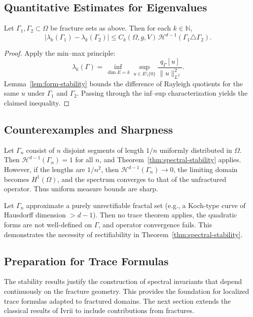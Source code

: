 \subsection{Quantitative Estimates for Eigenvalues}
\begin{theorem}
\label{thm:eigenvalue-continuity}
Let $\Gamma_1,\Gamma_2\subset\Omega$ be fracture sets as above. Then for each
$k\in\mathbb{N}$,
\[
|\lambda_k(\Gamma_1)-\lambda_k(\Gamma_2)|
  \leq C_k(\Omega,g,V)\,
     \mathcal{H}^{d-1}(\Gamma_1\triangle \Gamma_2).
\]
\end{theorem}

\begin{proof}
Apply the min–max principle:
\[
\lambda_k(\Gamma)
  = \inf_{\dim E=k}\sup_{u\in E\setminus\{0\}}
   \frac{q_\Gamma[u]}{\|u\|_{L^2}^2}.
\]
Lemma~\ref{lem:form-stability} bounds the difference of Rayleigh quotients
for the same $u$ under $\Gamma_1$ and $\Gamma_2$. Passing through the
inf–sup characterization yields the claimed inequality.
\end{proof}

\subsection{Counterexamples and Sharpness}
\begin{example}
Let $\Gamma_n$ consist of $n$ disjoint segments of length $1/n$ uniformly
distributed in $\Omega$. Then $\mathcal{H}^{d-1}(\Gamma_n)=1$ for all $n$, and
Theorem~\ref{thm:spectral-stability} applies. However, if the lengths are
$1/n^2$, then $\mathcal{H}^{d-1}(\Gamma_n)\to 0$, the limiting domain becomes
$H^1(\Omega)$, and the spectrum converges to that of the unfractured operator.
Thus uniform measure bounds are sharp.
\end{example}

\begin{example}
Let $\Gamma_n$ approximate a purely unrectifiable fractal set (e.g., a
Koch-type curve of Hausdorff dimension $>d-1$). Then no trace theorem applies,
the quadratic forms are not well-defined on $\Gamma$, and operator convergence
fails. This demonstrates the necessity of rectifiability in
Theorem~\ref{thm:spectral-stability}.
\end{example}

\subsection{Preparation for Trace Formulas}
The stability results justify the construction of spectral invariants that
depend continuously on the fracture geometry. This provides the foundation for
localized trace formulas adapted to fractured domains. The next section extends
the classical results of Ivrii \cite{Ivrii1998} to include contributions from
fractures.

